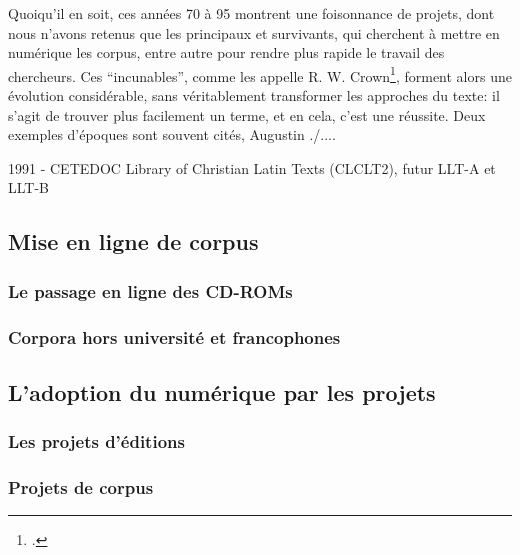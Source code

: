Quoiqu'il en soit, ces années 70 à 95 montrent une foisonnance de projets, dont nous n'avons retenus que les principaux et survivants, qui cherchent à mettre en numérique les corpus, entre autre pour rendre plus rapide le travail des chercheurs. Ces \enquote{incunables}, comme les appelle R. W. Crown\footcite[p.~107]{crown_comparing_2000}, forment alors une évolution considérable, sans véritablement transformer les approches du texte: il s'agit de trouver plus facilement un terme, et en cela, c'est une réussite. Deux exemples d'époques sont souvent cités, Augustin ./....





1991 - CETEDOC Library of Christian Latin Texts (CLCLT2), futur LLT-A et LLT-B

%

\subsection{Mise en ligne de corpus}

\subsubsection{Le passage en ligne des CD-ROMs}


\subsubsection{Corpora hors université et francophones}


\subsection{L’adoption du numérique par les projets}

\subsubsection{Les projets d’éditions}


\subsubsection{ Projets de corpus }

